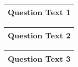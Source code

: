 \documentclass[a4paper,12pt]{article}
\begin{document}
  \begin{table}[ht!]
     \centering
     \begin{tabular}{|p{15cm}|}
     \hline        
Question Text 1
\\ \hline
      \end{tabular}
    \end{table}
    
  \begin{table}[ht!]
     \centering
     \begin{tabular}{|p{15cm}|}
     \hline  
Question Text 2   
 \\ \hline 
      \end{tabular}
    \end{table}
  \begin{table}[ht!]
     \centering
     \begin{tabular}{|p{15cm}|}
     \hline  
Question Text 3 
\\ \hline
      \end{tabular}
    \end{table}
        
\end{document}
